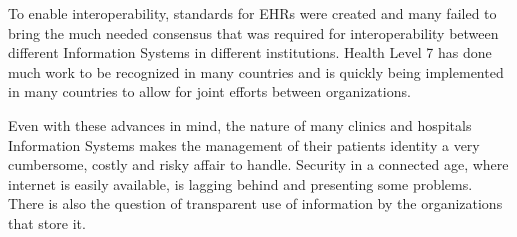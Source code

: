 To enable interoperability, standards for EHRs were created and many failed
to bring the much needed consensus that was required for interoperability
between different Information Systems in different institutions.
\cite{Eichelberg2006} Health Level 7 has done much work to be recognized in
many countries and is quickly being implemented in many countries to allow
for joint efforts between organizations. \cite{HL7Anual2016}

Even with these advances in mind, the nature of many clinics and hospitals
Information Systems makes the management of their patients identity a very
cumbersome, costly and risky affair to handle.  Security in a connected age,
where internet is easily available, is lagging behind and presenting some
problems.  There is also the question of transparent use of information by
the organizations that store it.
